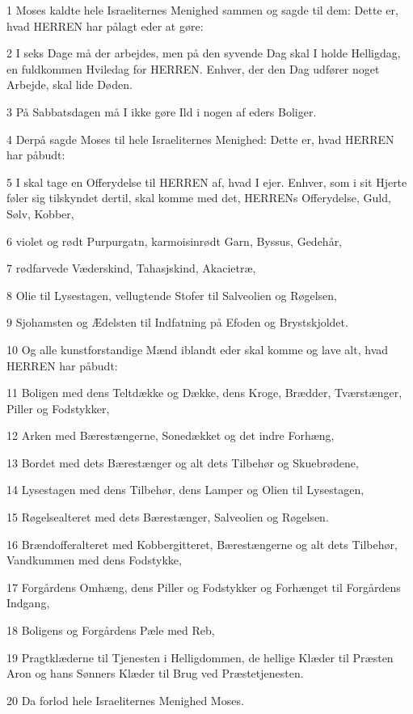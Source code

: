 \par 1 Moses kaldte hele Israeliternes Menighed sammen og sagde til dem: Dette er, hvad HERREN har pålagt eder at gøre:
\par 2 I seks Dage må der arbejdes, men på den syvende Dag skal I holde Helligdag, en fuldkommen Hviledag for HERREN. Enhver, der den Dag udfører noget Arbejde, skal lide Døden.
\par 3 På Sabbatsdagen må I ikke gøre Ild i nogen af eders Boliger.
\par 4 Derpå sagde Moses til hele Israeliternes Menighed: Dette er, hvad HERREN har påbudt:
\par 5 I skal tage en Offerydelse til HERREN af, hvad I ejer. Enhver, som i sit Hjerte føler sig tilskyndet dertil, skal komme med det, HERRENs Offerydelse, Guld, Sølv, Kobber,
\par 6 violet og rødt Purpurgatn, karmoisinrødt Garn, Byssus, Gedehår,
\par 7 rødfarvede Væderskind, Tahasjskind, Akacietræ,
\par 8 Olie til Lysestagen, vellugtende Stofer til Salveolien og Røgelsen,
\par 9 Sjohamsten og Ædelsten til Indfatning på Efoden og Brystskjoldet.
\par 10 Og alle kunstforstandige Mænd iblandt eder skal komme og lave alt, hvad HERREN har påbudt:
\par 11 Boligen med dens Teltdække og Dække, dens Kroge, Brædder, Tværstænger, Piller og Fodstykker,
\par 12 Arken med Bærestængerne, Sonedækket og det indre Forhæng,
\par 13 Bordet med dets Bærestænger og alt dets Tilbehør og Skuebrødene,
\par 14 Lysestagen med dens Tilbehør, dens Lamper og Olien til Lysestagen,
\par 15 Røgelsealteret med dets Bærestænger, Salveolien og Røgelsen.
\par 16 Brændofferalteret med Kobbergitteret, Bærestængerne og alt dets Tilbehør, Vandkummen med dens Fodstykke,
\par 17 Forgårdens Omhæng, dens Piller og Fodstykker og Forhænget til Forgårdens Indgang,
\par 18 Boligens og Forgårdens Pæle med Reb,
\par 19 Pragtklæderne til Tjenesten i Helligdommen, de hellige Klæder til Præsten Aron og hans Sønners Klæder til Brug ved Præstetjenesten.
\par 20 Da forlod hele Israeliternes Menighed Moses.
